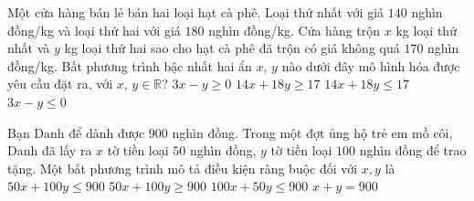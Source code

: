 

\begin{ex}%
	Một cửa hàng bán lẻ bán hai loại hạt cà phê. Loại thứ nhất với  giá $140$ nghìn đồng/kg và loại thứ hai với giá $180$ nghìn đồng/kg. Cửa hàng trộn $x$ kg loại thứ nhất và $y$ kg loại thứ hai sao cho hạt cà phê đã trộn có giá không quá $170$ nghìn đồng/kg. Bất phương trình bậc nhất hai ẩn $x$, $y$ nào dưới đây mô hình hóa được yêu cầu đặt ra, với $x$, $y\in \mathbb{R}$?
	 \choice
		{$3x-y\ge 0$} 
		 {$14x+18y\ge 17$}
		 {\True $14x+18y\le 17$}
		{$3x-y\le 0$} 
\end{ex}

\begin{ex}%
	Bạn Danh để dành được $900$ nghìn đồng. Trong một đợt ủng hộ trẻ em mồ côi, Danh đã lấy ra $x$ tờ tiền loại $50$ nghìn đồng, $y$ tờ tiền loại $100$ nghìn đồng  để trao tặng. Một bất phương trình mô tả điều kiện ràng buộc đối với $x,y$ là
	 \choice
		{\True  $50x+100y\le 900$}
		{$50x+100y\ge  900$}
		{$100x+50y\le 900$} 
		{$x+y=900$} 
\end{ex}

